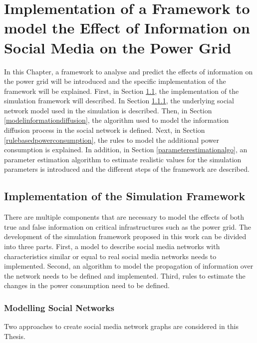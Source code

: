 \chapter{Implementation of a Framework to model the Effect
of Information on Social Media on the Power Grid}
\label{implementationall}
In this Chapter, a framework to analyse and predict 
the effects of information on the 
power grid will be introduced and the specific implementation of the 
framework will be explained.
First, in Section \ref{simulationframeworksection}, 
the implementation of the simulation framework will described.
In Section \ref{modelsocialnetwork}, the underlying social network model
used in the simulation is described. Then, in Section 
\ref{modelinformationdiffusion}, the algorithm used to model
the information diffusion process in the social network is 
defined. Next, in Section \ref{rulebasedpowerconsumption}, 
the rules to model the additional power consumption is explained.
In addition, in Section \ref{parameterestimationalgo},
an parameter estimation algorithm to estimate realistic 
values for the simulation parameters is introduced and 
the different steps of the framework are described.

\section{Implementation of the Simulation Framework}
\label{simulationframeworksection}
There are multiple components that are necessary to model the effects of 
both true and false information on critical infrastructures
such as the power grid. The development of the simulation framework
proposed in this work can be divided into three parts. First, a model 
to describe social media networks with characteristics similar 
or equal to real social media networks needs to implemented.
Second, an algorithm to model the 
propagation of information over the network needs to be defined and 
implemented. Third, rules to estimate the changes in the power consumption 
need to be defined.

\subsection{Modelling Social Networks}
\label{modelsocialnetwork}
Two approaches to create social media network graphs 
are considered in this Thesis.

